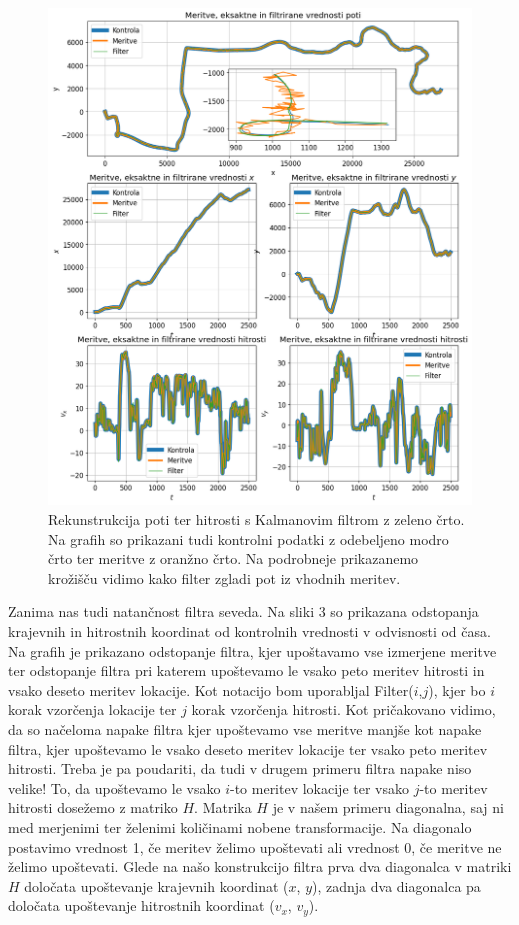 \documentclass[slovene,11pt,a4paper]{article}
\begin{document}
\begin{figure}[h!]
\centering
\includegraphics[width=14cm]{slika2.png}
\caption{Rekunstrukcija poti ter hitrosti s Kalmanovim filtrom z zeleno črto. Na grafih so prikazani tudi kontrolni podatki z odebeljeno modro črto ter meritve z oranžno črto. Na podrobneje prikazanemo krožišču vidimo kako filter zgladi pot iz vhodnih meritev.}
\end{figure}

Zanima nas tudi natančnost filtra seveda. Na sliki 3 so prikazana odstopanja krajevnih in hitrostnih koordinat od kontrolnih vrednosti v odvisnosti od časa. Na grafih je prikazano odstopanje filtra, kjer upoštavamo vse izmerjene meritve ter odstopanje filtra pri katerem upoštevamo le vsako peto meritev hitrosti in vsako deseto meritev lokacije. Kot notacijo bom uporabljal Filter($i$,$j$), kjer bo $i$ korak vzorčenja lokacije ter $j$ korak vzorčenja hitrosti. Kot pričakovano vidimo, da so načeloma napake filtra kjer upoštevamo vse meritve manjše kot napake filtra, kjer upoštevamo le vsako deseto meritev lokacije ter vsako peto meritev hitrosti. Treba je pa poudariti, da tudi v drugem primeru filtra napake niso velike! To, da upoštevamo le vsako $i$-to meritev lokacije ter vsako $j$-to meritev hitrosti dosežemo z matriko $H$. Matrika $H$ je v našem primeru diagonalna, saj ni med merjenimi ter želenimi količinami nobene transformacije. Na diagonalo postavimo vrednost 1, če meritev želimo upoštevati ali vrednost 0, če meritve ne želimo upoštevati. Glede na našo konstrukcijo filtra prva dva diagonalca v matriki $H$ določata upoštevanje krajevnih koordinat ($x$, $y$), zadnja dva diagonalca pa določata upoštevanje hitrostnih koordinat ($v_x$, $v_y$).
\end{document}
